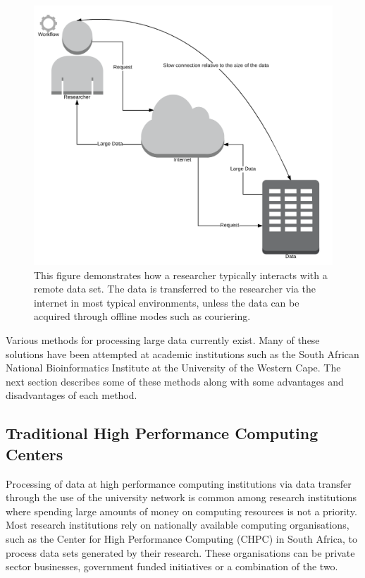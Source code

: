 \begin{figure}[ht!]
\centering
\includegraphics[width=\textwidth]{Figures/traditional_processing_model.png}
\decoRule
\caption[Traditional Researcher Data Usage Model]{This figure demonstrates how a researcher typically interacts with a remote data set. The data is transferred to the researcher via the internet in most typical environments, unless the data can be acquired through offline modes such as couriering.}
\label{fig:traditional_data_model}
\end{figure}


Various methods for processing large data currently exist. Many of these solutions have been attempted at academic institutions such as the South African National Bioinformatics Institute at the University of the Western Cape. The next section describes some of these methods along with some advantages and disadvantages of each method.

\subsection{Traditional High Performance Computing Centers}

Processing of data at high performance computing institutions via data transfer through the use of the university network is common among research institutions where spending large amounts of money on computing resources is not a priority. Most research institutions rely on nationally available computing organisations, such as the Center for High Performance Computing (CHPC) in South Africa, to process data sets generated by their research. These organisations can be private sector businesses, government funded initiatives or a combination of the two.

